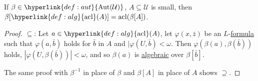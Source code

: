 \documentclass{article}
\DeclareMathOperator{\Aut}{Aut}
\DeclareMathOperator{\acl}{acl}
\begin{document}
\begin{nprop}\label{prop:7.14}
  If $\beta\in \hyperlink{def:aut}{\Aut(\mathcal{U})}$, $A \subseteq \mathcal{U}$ is small, then $\beta[\hyperlink{def:alg}{\acl}(A)] = \acl(\beta[A])$.
\end{nprop}
\begin{proof}
  $\subseteq$: Let $a \in \hyperlink{def:alg}{\acl}(A)$, let $\varphi(x, \bar{z})$ be an $L$-\hyperlink{def:form}{formula} such that $\varphi(a, \bar{b})$ holds for $\bar{b}$ in $A$ and $|\varphi(U, \bar{b}) < \omega$.
  Then $\varphi(\beta(a), \beta(\bar{b}))$ holds, $|\varphi(U, \beta(\bar{b}))|<\omega$, and so $\beta(a)$ is \hyperlink{def:alg}{algebraic} over $\beta[\bar{b}]$.

  The same proof with $\beta^{-1}$ in place of $\beta$ and $\beta[A]$ in place of $A$ shows $\supseteq$.
\end{proof}

\clearpage
\end{document}
